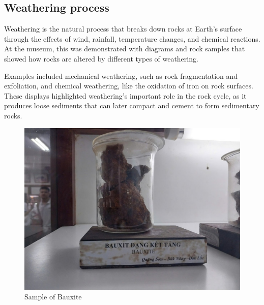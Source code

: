 \subsection{Weathering process}
\label{subsec:weathering-process}

Weathering is the natural process that breaks down rocks at Earth's surface through the effects of wind, rainfall, temperature changes, and chemical reactions. At the museum, this was demonstrated with diagrams and rock samples that showed how rocks are altered by different types of weathering.

Examples included mechanical weathering, such as rock fragmentation and exfoliation, and chemical weathering, like the oxidation of iron on rock surfaces. These displays highlighted weathering's important role in the rock cycle, as it produces loose sediments that can later compact and cement to form sedimentary rocks.

\begin{figure}[H]
  \centering
  \includegraphics[max width=0.8\linewidth]{graphics/figure_10.jpg}
\caption{Sample of Bauxite}
\label{fig:bauxite}
\end{figure}